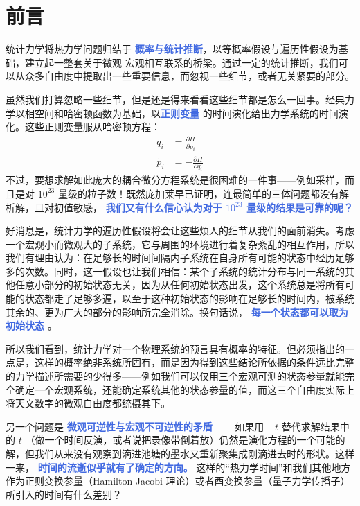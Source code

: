 \documentclass[hyperref,UTF-8]{ctexbook}
\newcommand{\0}{\boldsymbol{0}}
\begin{document}
\chapter{前言}\label{cha:前言}

统计力学将热力学问题归结于 \textcolor{RoyalBlue}{\textbf{\kaishu 概率与统计推断}}，以等概率假设与遍历性假设为基础，建立起一整套关于微观-宏观相互联系的桥梁。通过一定的统计推断，我们可以从众多自由度中提取出一些重要信息，而忽视一些细节，或者无关紧要的部分\cite{suyu}。

虽然我们打算忽略一些细节，但是还是得来看看这些细节都是怎么一回事。经典力学以相空间和哈密顿函数为基础，以\textcolor{RoyalBlue}{\textbf{\kaishu 正则变量}} 的时间演化给出力学系统的时间演化。这些正则变量服从哈密顿方程：
\begin{align}
    \dot{q_i} &= \frac{\partial H}{\partial p_i} \\
    \dot{p_i} &= -\frac{\partial H}{\partial q_i}
\end{align}
不过，要想求解如此庞大的耦合微分方程系统是很困难的一件事——例如采样，而且是对 $10^{23}$ 量级的粒子数！既然庞加莱早已证明，连最简单的三体问题都没有解析解，且对初值敏感， \textcolor{RoyalBlue}{\textbf{ \kaishu 我们又有什么信心认为对于 $10^{23}$ 量级的结果是可靠的呢？}}

好消息是，统计力学的遍历性假设将会让这些烦人的细节从我们的面前消失。考虑一个宏观小而微观大的子系统，它与周围的环境进行着复杂紊乱的相互作用，所以我们有理由认为：在足够长的时间间隔内子系统在自身所有可能的状态中经历足够多的次数\cite{lan}。同时，这一假设也让我们相信：某个子系统的统计分布与同一系统的其他任意小部分的初始状态无关，因为从任何初始状态出发，这个系统总是将所有可能的状态都走了足够多遍，以至于这种初始状态的影响在足够长的时间内，被系统其余的、更为广大的部分的影响所完全消除。换句话说， \textcolor{RoyalBlue}{\textbf{\kaishu 每一个状态都可以取为初始状态}} 。

所以我们看到，统计力学对一个物理系统的预言具有概率的特征。但必须指出的一点是，这样的概率绝非系统所固有，而是因为得到这些结论所依据的条件远比完整的力学描述所需要的少得多——例如我们可以仅用三个宏观可测的状态参量就能完全确定一个宏观系统，还能确定系统其他的状态参量的值，而这三个自由度实际上将天文数字的微观自由度都统摄其下。

另一个问题是 \textcolor{RoyalBlue}{\textbf{\kaishu 微观可逆性与宏观不可逆性的矛盾 }}——如果用 $-t$ 替代求解结果中的 $t$ （做一个时间反演，或者说把录像带倒着放）仍然是演化方程的一个可能的解，但我们从来没有观察到滴进池塘的墨水又重新聚集成刚滴进去时的形状。这样一来， \textcolor{RoyalBlue}{\textbf{\kaishu 时间的流逝似乎就有了确定的方向。}} 这样的“热力学时间”和我们其他地方作为正则变换参量（Hamilton-Jacobi 理论）或者酉变换参量（量子力学传播子）所引入的时间有什么差别？
\end{document}

